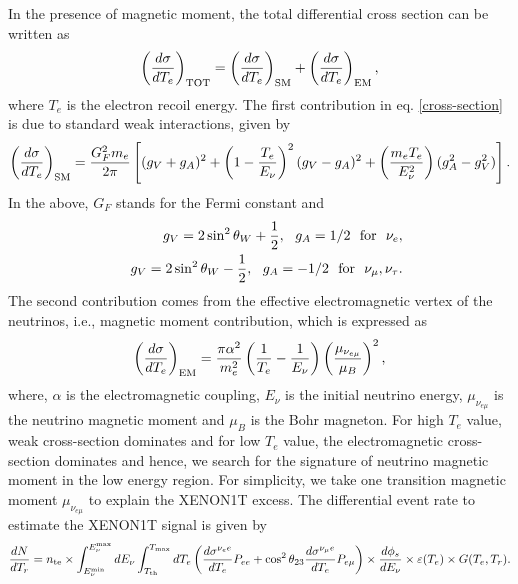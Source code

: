 \documentclass[aps, a4paper,superscriptaddress,12pt,preprintnumbers,floatfix,nofootinbib,amsmath,amssymb]{revtex4}
\newcommand{\nn}{\nonumber}
\def \epsilon {\varepsilon} %
\begin{document}
In the presence of magnetic moment, the total differential cross section can be written as \cite{Giunti:2015gga}
\begin{eqnarray}
    \left( \frac{d \sigma}{d T_{e}} \right)_{\rm TOT} =  \left( \frac{d \sigma}{d T_{e}} \right)_{\rm SM} + \left( \frac{d \sigma}{d T_{e}} \right)_{\rm EM},
    \label{cross-section}
\end{eqnarray}
where $T_{e}$ is the electron recoil energy. The first contribution in eq. \ref{cross-section} is due to standard weak interactions, given by
\begin{equation}
\left( \frac{d \sigma}{d T_{e}} \right)_{\rm SM} =  \frac{G_F^2 m_e}{2\pi} \left[(g_V + g_A)^2 + \left(1-\frac{T_e}{E_\nu}\right)^2(g_V - g_A)^2 + \left(\frac{m_e T_e}{E_\nu^2}\right)(g^2_A - g^2_V)\right].
\end{equation}
In the above, $G_F$ stands for the Fermi constant and
\begin{eqnarray}
&&g_V = 2\sin^2 \theta_W + \frac{1}{2},~~ g_A = 1/2 ~~{\rm for}~~ \nu_e, \nn\\
&&g_V = 2\sin^2 \theta_W - \frac{1}{2},~~ g_A = -1/2 ~~{\rm for}~~ \nu_\mu, \nu_\tau.
\end{eqnarray}
The second contribution comes from the effective electromagnetic vertex of the neutrinos, i.e.,  magnetic moment contribution, which is expressed as
\begin{eqnarray}
    \left( \frac{d \sigma}{d T_{e}} \right)_{\rm EM} = \frac{\pi \alpha^{2}}{m^{2}_{e}} \left( \frac{1}{T_{e}} - \frac{1}{E_{\nu}} \right) \left( \frac{\mu_{\nu_{e\mu}}}{\mu_{B}} \right)^{2},
\end{eqnarray}
where, $\alpha$ is the electromagnetic coupling, $E_{\nu}$ is the initial neutrino energy, $\mu_{\nu_{e \mu}}$ is the neutrino magnetic moment and $\mu_{B}$ is the Bohr magneton. For high $T_{e}$ value, weak cross-section dominates and for low $T_{e}$ value, the electromagnetic cross-section dominates and hence, we search for the signature of neutrino magnetic moment in the low energy region. For simplicity, we take one transition magnetic moment $\mu_{{\nu}_{e \mu}}$ to explain the XENON1T excess. The differential event rate to estimate the XENON1T signal is given by
\begin{equation}
\frac{dN}{ dT_r} =  n_{\rm te}\times \int^{E^{\rm max}_\nu}_{E^{\rm min}_\nu} dE_\nu \int_{T_{\rm th}}^{T_{\rm max}} dT_e \left(\frac{d\sigma^{\nu_e e}}{dT_e} P_{ee} + \cos^2 \theta_{23} \frac{d\sigma^{\nu_\mu e}}{dT_e} P_{e\mu}\right) \times \frac{d\phi_s}{dE_\nu} \times \epsilon(T_e)\times G(T_e,T_r).
\end{equation}
\end{document}

